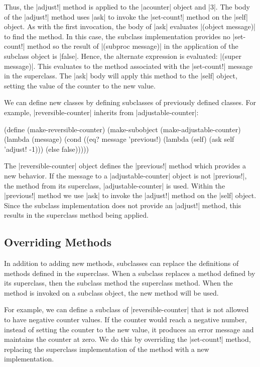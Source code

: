 \begin{schemeregion}
Thus, the \scheme|adjust!| method is applied to the \scheme|acounter| object and \scheme|3|.  The body of the \scheme|adjust!| method uses \scheme|ask| to invoke the \scheme|set-count!| method on the \scheme|self| object.  As with the first invocation, the body of \scheme|ask| evaluates \scheme|(object message)| to find the method.  In this case, the subclass implementation provides no \scheme|set-count!| method so the result of \scheme|(subproc message)| in the application of the subclass object is \schemeresult|false|.  Hence, the alternate expression is evaluated: \scheme|(super message)|.  This evaluates to the method associated with the \scheme|set-count!| message in the superclass.  The \scheme|ask| body will apply this method to the \scheme|self| object, setting the value of the counter to the new value.

We can define new classes by defining subclasses of previously defined classes.  For example, \scheme|reversible-counter| inherits from \scheme|adjustable-counter|:
\begin{schemedisplay}
(define (make-reversible-counter)
  (make-subobject
   (make-adjustable-counter)
   (lambda (message)
     (cond 
      ((eq? message 'previous!) (lambda (self) (ask self 'adjust! -1)))
      (else false)))))	
\end{schemedisplay}

The \scheme|reversible-counter| object defines the \scheme|previous!| method which provides a new behavior.  If the message to a \scheme|adjustable-counter| object is not \scheme|previous!|, the method from its superclass, \scheme|adjustable-counter| is used.  Within the \scheme|previous!| method we use \scheme|ask| to invoke the \scheme|adjust!| method on the \scheme|self| object.  Since the subclass implementation does not provide an \scheme|adjust!| method, this results in the superclass method being applied.

\subsection{Overriding Methods}\label{sec:overriding}
In addition to adding new methods, subclasses can replace the definitions of methods defined in the superclass. When a subclass replaces a method defined by its superclass, then the subclass method  the superclass method.  When the method is invoked on a subclass object, the new method will be used.

For example, we can define a subclass of \scheme|reversible-counter| that is not allowed to have negative counter values.  If the counter would reach a negative number, instead of setting the counter to the new value, it produces an error message and maintains the counter at zero.  We do this by overriding the \scheme|set-count!| method, replacing the superclass implementation of the method with a new implementation.


\end{schemeregion}
